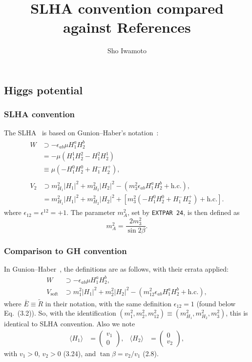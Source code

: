 \documentclass[a4paper,11pt,captions=tableheading,DIV=12]{scrartcl}
\title{SLHA convention compared against References}
\author{Sho Iwamoto}
\date{}
\newcommand\w[1]{_{\mathrm{#1}}}
\newcommand\pmat[1]{\begin{pmatrix}#1\end{pmatrix}}
\newcommand{\bE}{\bar E}
\begin{document}
\maketitle

\subsection{Higgs potential}

\subsubsection{SLHA convention}
The SLHA~\cite{SLHA} is based on Gunion--Haber's notation~\cite{GH}:
\begin{align}
\begin{split}
  W &\supset-\epsilon_{ab}
 \mu H_1^aH_2^b
 \\&=-\mu(H_1^1H_2^2-H_1^2H_2^1)
 \\&\equiv \mu(-H_1^0H_2^0+H_1^-H_2^+),
\end{split}
 \tag{SLHA:3}\\
\begin{split}
  V_2 &\supset
  m_{H_{1}}^{2}|H_1|^2
 + m_{H_{2}}^{2}|H_2|^2
 - (m_3^2\epsilon_{ab}H_1^aH_2^b +\text{h.c.}),
\\
&=
  m_{H_{1}}^{2}|H_1|^2
 + m_{H_{2}}^{2}|H_2|^2
+ \left[m_3^2 (-H_1^0H_2^0+H_1^-H_2^+) +\text{h.c.}\right].
\end{split}
 \tag{SLHA:7}
\end{align}
where $\epsilon_{12}=\epsilon^{12}=+1$.
The parameter $m_A^2$, set by \texttt{EXTPAR 24}, is then defined as
\begin{equation}
 m_A^2 = \frac{2m_3^2}{\sin2\beta}.
\tag{SLHA:8}
\end{equation}

\subsubsection{Comparison to GH convention}
In Gunion--Haber~\cite{GH}, the definitions are as follows, with their errata applied:
\begin{align}
 W &\supset -\epsilon_{ab}\mu H_1^aH_2^b,\tag{GH:3.3--3.4}
\\
V\w{soft}&\supset m_1^2|H_1|^2 + m_2^2 |H_2|^2 - (m_{12}^2\epsilon_{ab}H_1^a H_2^b+\text{h.c.}),
\tag{GH:3.9}
%
\end{align}
where $\bE\equiv\tilde R$ in their notation, with the same definition $\epsilon_{12}=1$ (found below Eq.~(3.2)).
So, with the identification $(m_1^2,m_2^2,m_{12}^2)\equiv(m_{H_1}^2,m_{H_2}^2,m_3^2)$, this is identical to SLHA convention.
Also we note
\begin{align}
 \langle H_1\rangle &= \pmat{v_1\\0},&
 \langle H_2\rangle &= \pmat{0\\v_2},
\tag{GH:3.7}
\end{align}
with $v_1>0$, $v_2>0$ (3.24), and $\tan\beta=v_2/v_1$ (2.8).
\end{document}
